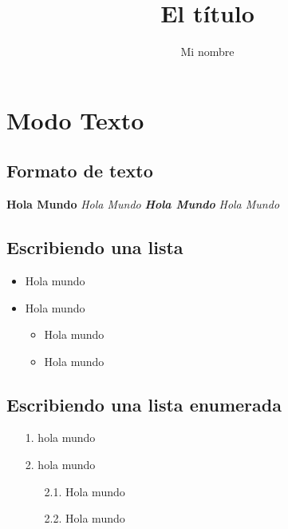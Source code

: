 \documentclass{article}
\title{El título}
\author{Mi nombre}
\date{}
\begin{document}
    \maketitle
    
    \tableofcontents

\section{Modo Texto}
        \subsection{Formato de texto}
            \textbf{Hola Mundo} \textit{Hola Mundo} \textbf{\textit{Hola Mundo}} \emph{Hola Mundo}
        
        \subsection{Escribiendo una lista}
            \begin{itemize}
                \item Hola mundo
                \item Hola mundo
                    \begin{itemize}
                        \item Hola mundo
                        \item Hola mundo
                    \end{itemize}
            \end{itemize}
         
        \subsection{Escribiendo una lista enumerada}   
            \begin{enumerate}
                \item [1.] hola mundo
                \item [2.] hola mundo
                    \begin{enumerate}
                        \item [2.1.] Hola mundo
                        \item [2.2.] Hola mundo
                    \end{enumerate}
            \end{enumerate}
        
\end{document}
